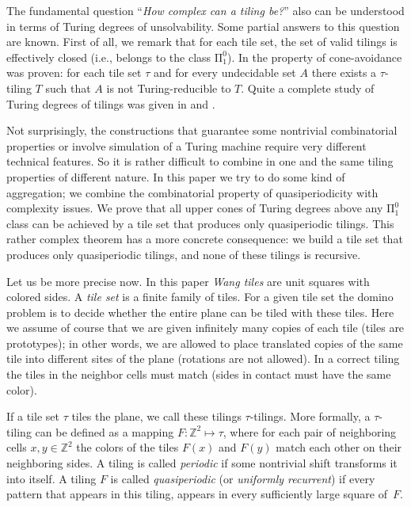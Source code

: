 \documentclass[runningheads]{llncs}
\begin{document}
The fundamental question ``\emph{How complex can a tiling be?}'' also can be understood in terms of Turing degrees of unsolvability.   Some partial answers to this question are known.  First of all, we remark that for each tile set, the set of valid tilings is effectively closed  (i.e., belongs to the class $\mathrm\Pi_1^0$). 
In \cite{dls} the property of cone-avoidance  was proven: for each tile set $\tau$ and for every undecidable set $A$ there exists a $\tau$-tiling $T$ such that $A$ is not Turing-reducible to $T$.
Quite a complete study of Turing degrees of tilings was given in \cite{pascal1} and \cite{pascal2}. 

Not surprisingly, the constructions that guarantee some nontrivial combinatorial properties or involve simulation of a Turing machine require very different technical features. So it is  rather difficult to combine in one and  the same tiling properties of different nature.
In this paper we try to do some kind of aggregation;  we combine  the combinatorial property of quasiperiodicity with complexity issues. We prove that all upper cones of Turing degrees above any $\mathrm \Pi_1^0$ class can be achieved by a tile set that produces only quasiperiodic tilings. This rather complex theorem has a more concrete consequence: we build a tile set that produces only quasiperiodic tilings, and none of these tilings is recursive.




Let us be more precise now. In this paper  \emph{Wang tiles} are unit squares with colored sides. A \emph{tile set} is a finite family of tiles. For a given tile set the domino problem is to decide whether the entire plane can be tiled with these tiles. Here we assume of course that we are given infinitely many copies of each tile (tiles are prototypes); in other words, we are allowed to  place translated copies of the same tile into different sites of the plane (rotations are not allowed). In a correct tiling the tiles in the neighbor cells must match (sides in contact must have the same color). 

If a tile set $\tau$ tiles the plane, we call these tilings $\tau$-tilings. More formally,  a $\tau$-tiling can be defined as a mapping $F\colon\mathbb{Z}^2\mapsto \tau$, where for each pair of neighboring cells  $x,y\in \mathbb{Z}^2$  the colors of the tiles $F(x)$ and $F(y)$  match each other on their neighboring sides.
A tiling is called \emph{periodic} if some nontrivial shift transforms it into itself. A tiling $F$ is called \emph{quasiperiodic} (or \emph{uniformly recurrent}) if 
every pattern that appears in this tiling,  appears in every sufficiently large square of~$F$.
\end{document}
